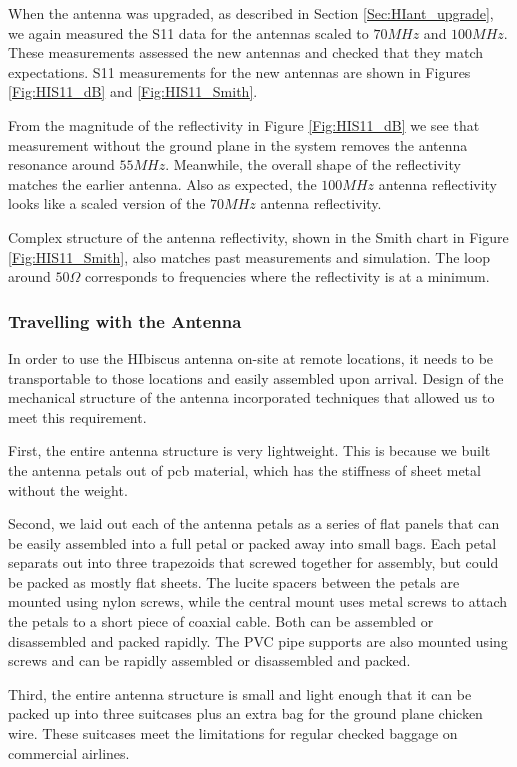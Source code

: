 When the antenna was upgraded, as described in Section \ref{Sec:HIant_upgrade}, we again measured the S11 data for the antennas scaled to $70 MHz$ and $100 MHz$. These measurements assessed the new antennas and checked that they match expectations. S11 measurements for the new antennas are shown in Figures \ref{Fig:HIS11_dB} and \ref{Fig:HIS11_Smith}. 

From the magnitude of the reflectivity in Figure \ref{Fig:HIS11_dB} we see that measurement without the ground plane in the system removes the antenna resonance around $55 MHz$. Meanwhile, the overall shape of the reflectivity matches the earlier antenna. Also as expected, the $100 MHz$ antenna reflectivity looks like a scaled version of the $70 MHz$ antenna reflectivity. 

Complex structure of the antenna reflectivity, shown in the Smith chart in Figure \ref{Fig:HIS11_Smith}, also matches past measurements and simulation. The loop around $50 \Omega$ corresponds to frequencies where the reflectivity is at a minimum. 

\subsubsection{Travelling with the Antenna}

In order to use the HIbiscus antenna on-site at remote locations, it needs to be transportable to those locations and easily assembled upon arrival. Design of the mechanical structure of the antenna incorporated techniques that allowed us to meet this requirement. 

First, the entire antenna structure is very lightweight. This is because we built the antenna petals out of pcb material, which has the stiffness of sheet metal without the weight.  

Second, we laid out each of the antenna petals as a series of flat panels that can be easily assembled into a full petal or packed away into small bags. Each petal separats out into three trapezoids that screwed together for assembly, but could be packed as mostly flat sheets. The lucite spacers between the petals are mounted using nylon screws, while the central mount uses metal screws to attach the petals to a short piece of coaxial cable. Both can be assembled or disassembled and packed rapidly. The PVC pipe supports are also mounted using screws and can be rapidly assembled or disassembled and packed. 

Third, the entire antenna structure is small and light enough that it can be packed up into three suitcases plus an extra bag for the ground plane chicken wire. These suitcases meet the limitations for regular checked baggage on commercial airlines. 


